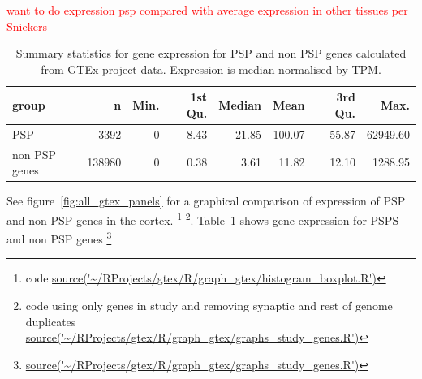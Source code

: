  \textcolor{red}{want to do expression psp compared with average expression in other tissues per Sniekers}

\begin{table}[ht]
\centering
\begin{tabular}{lrrrrrrr}
  \hline
group & n & Min. & 1st Qu. & Median & Mean & 3rd Qu. & Max. \\ 
  \hline
PSP & 3392 & 0 & 8.43 & 21.85 & 100.07 & 55.87 & 62949.60 \\ 
  non PSP genes & 138980 & 0 & 0.38 & 3.61 & 11.82 & 12.10 & 1288.95 \\ 
   \hline
\end{tabular}
\caption{Summary statistics for gene expression for PSP and non PSP genes calculated from GTEx project data. Expression is median normalised by TPM.}
\label{tab:Summary statistics for gene expression for PSP and non PSP genes}
\end{table}


    See figure~\ref{fig:all_gtex_panels} for a graphical comparison of expression of PSP and non PSP genes in the cortex. \footnote{code \url{source('~/RProjects/gtex/R/graph_gtex/histogram_boxplot.R')} } \footnote{code using only genes in study and removing synaptic and rest of genome duplicates \url{source('~/RProjects/gtex/R/graph_gtex/graphs_study_genes.R')} }. Table~\ref{tab:Summary statistics for gene expression for PSP and non PSP genes} shows gene expression for PSPS and non PSP genes \footnote{\url{source('~/RProjects/gtex/R/graph_gtex/graphs_study_genes.R')}}
    
    
    
